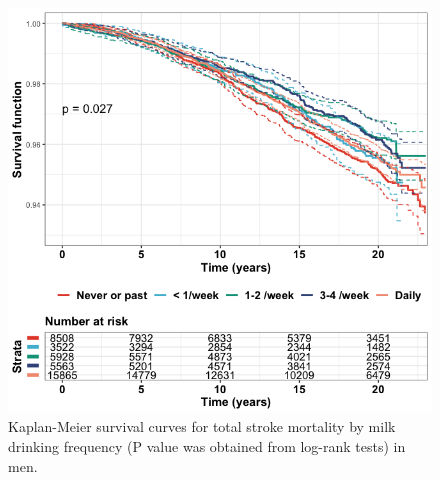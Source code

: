 \documentclass[]{tufte-handout}
\begin{document}
\begin{figure}

{\centering \includegraphics[width=0.95\linewidth]{fig/KMfigMen} 

}

\caption[Kaplan-Meier survival curves for total stroke mortality by milk drinking frequency (P value was obtained from log-rank tests) in men]{Kaplan-Meier survival curves for total stroke mortality by milk drinking frequency (P value was obtained from log-rank tests) in men.}\label{fig:KMmen}
\end{figure}
\end{document}
